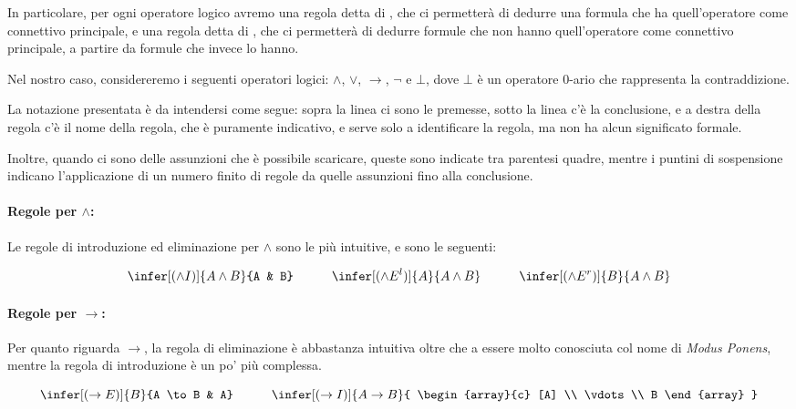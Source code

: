 In particolare, per ogni operatore logico avremo una regola detta di , che ci permetterà di dedurre una formula che ha quell'operatore come connettivo principale, e una regola detta di , che ci permetterà di dedurre formule che non hanno quell'operatore come connettivo principale, a partire da formule che invece lo hanno.

Nel nostro caso, considereremo i seguenti operatori logici: \(\land\), \(\lor\), \(\to\), \(\neg\) e \(\bot\), dove \(\bot\) è un operatore \(0\)-ario che rappresenta la contraddizione.

\begin{note}{}
  La notazione presentata è da intendersi come segue: sopra la linea ci sono le premesse, sotto la linea c'è la conclusione, e a destra della regola c'è il nome della regola, che è puramente indicativo, e serve solo a identificare la regola, ma non ha alcun significato formale.

  Inoltre, quando ci sono delle assunzioni che è possibile scaricare, queste sono indicate tra parentesi quadre, mentre i puntini di sospensione indicano l'applicazione di un numero finito di regole da quelle assunzioni fino alla conclusione.
\end{note}

\paragraph{Regole per \(\land\):}

Le regole di introduzione ed eliminazione per \(\land\) sono le più intuitive, e sono le seguenti:

\begin{equation*}
  \infer[(\land I)]{A \land B}{A & B} \quad\quad\quad \infer[(\land E^l)]{A}{A \land B} \quad\quad\quad \infer[(\land E^r)]{B}{A \land B}
\end{equation*}

\paragraph{Regole per \(\to\):}

Per quanto riguarda \(\to\), la regola di eliminazione è abbastanza intuitiva oltre che a essere molto conosciuta col nome di \textit{Modus Ponens}, mentre la regola di introduzione è un po' più complessa.

\begin{equation*}
  \infer[(\to E)]{B}{A \to B & A} \quad\quad\quad
  \infer[(\to I)]{A \to B}{
    \begin{array}{c}
    [A] \\
    \vdots \\
    B
  \end{array}
    } 
\end{equation*}

